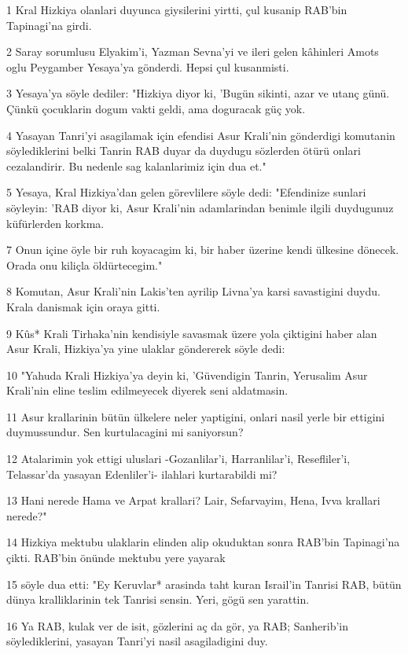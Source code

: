 \par 1 Kral Hizkiya olanlari duyunca giysilerini yirtti, çul kusanip RAB'bin Tapinagi'na girdi.
\par 2 Saray sorumlusu Elyakim'i, Yazman Sevna'yi ve ileri gelen kâhinleri Amots oglu Peygamber Yesaya'ya gönderdi. Hepsi çul kusanmisti.
\par 3 Yesaya'ya söyle dediler: "Hizkiya diyor ki, 'Bugün sikinti, azar ve utanç günü. Çünkü çocuklarin dogum vakti geldi, ama doguracak güç yok.
\par 4 Yasayan Tanri'yi asagilamak için efendisi Asur Krali'nin gönderdigi komutanin söylediklerini belki Tanrin RAB duyar da duydugu sözlerden ötürü onlari cezalandirir. Bu nedenle sag kalanlarimiz için dua et."
\par 5 Yesaya, Kral Hizkiya'dan gelen görevlilere söyle dedi: "Efendinize sunlari söyleyin: 'RAB diyor ki, Asur Krali'nin adamlarindan benimle ilgili duydugunuz küfürlerden korkma.
\par 7 Onun içine öyle bir ruh koyacagim ki, bir haber üzerine kendi ülkesine dönecek. Orada onu kiliçla öldürtecegim."
\par 8 Komutan, Asur Krali'nin Lakis'ten ayrilip Livna'ya karsi savastigini duydu. Krala danismak için oraya gitti.
\par 9 Kûs* Krali Tirhaka'nin kendisiyle savasmak üzere yola çiktigini haber alan Asur Krali, Hizkiya'ya yine ulaklar göndererek söyle dedi:
\par 10 "Yahuda Krali Hizkiya'ya deyin ki, 'Güvendigin Tanrin, Yerusalim Asur Krali'nin eline teslim edilmeyecek diyerek seni aldatmasin.
\par 11 Asur krallarinin bütün ülkelere neler yaptigini, onlari nasil yerle bir ettigini duymussundur. Sen kurtulacagini mi saniyorsun?
\par 12 Atalarimin yok ettigi uluslari -Gozanlilar'i, Harranlilar'i, Resefliler'i, Telassar'da yasayan Edenliler'i- ilahlari kurtarabildi mi?
\par 13 Hani nerede Hama ve Arpat krallari? Lair, Sefarvayim, Hena, Ivva krallari nerede?"
\par 14 Hizkiya mektubu ulaklarin elinden alip okuduktan sonra RAB'bin Tapinagi'na çikti. RAB'bin önünde mektubu yere yayarak
\par 15 söyle dua etti: "Ey Keruvlar* arasinda taht kuran Israil'in Tanrisi RAB, bütün dünya kralliklarinin tek Tanrisi sensin. Yeri, gögü sen yarattin.
\par 16 Ya RAB, kulak ver de isit, gözlerini aç da gör, ya RAB; Sanherib'in söylediklerini, yasayan Tanri'yi nasil asagiladigini duy.
